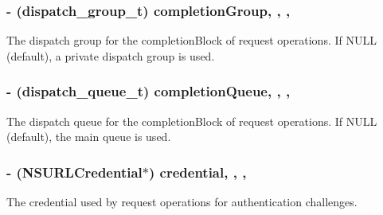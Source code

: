 \subsubsection[{completion\+Group}]{\setlength{\rightskip}{0pt plus 5cm}-\/ (dispatch\+\_\+group\+\_\+t) completion\+Group\hspace{0.3cm}{\ttfamily [read]}, {\ttfamily [write]}, {\ttfamily [nonatomic]}, {\ttfamily [assign]}}\label{interface_a_f_h_t_t_p_request_operation_manager_a82471e7500e97f86cec41fce3fc43347}
The dispatch group for the {\ttfamily completion\+Block} of request operations. If {\ttfamily N\+U\+L\+L} (default), a private dispatch group is used. \hypertarget{interface_a_f_h_t_t_p_request_operation_manager_af1b09e063908143fda4bb0b0b176908d}{}
\subsubsection[{completion\+Queue}]{\setlength{\rightskip}{0pt plus 5cm}-\/ (dispatch\+\_\+queue\+\_\+t) completion\+Queue\hspace{0.3cm}{\ttfamily [read]}, {\ttfamily [write]}, {\ttfamily [nonatomic]}, {\ttfamily [assign]}}\label{interface_a_f_h_t_t_p_request_operation_manager_af1b09e063908143fda4bb0b0b176908d}
The dispatch queue for the {\ttfamily completion\+Block} of request operations. If {\ttfamily N\+U\+L\+L} (default), the main queue is used. \hypertarget{interface_a_f_h_t_t_p_request_operation_manager_a95eccce77426e7b9022ac52d60749534}{}
\subsubsection[{credential}]{\setlength{\rightskip}{0pt plus 5cm}-\/ (N\+S\+U\+R\+L\+Credential$\ast$) credential\hspace{0.3cm}{\ttfamily [read]}, {\ttfamily [write]}, {\ttfamily [nonatomic]}, {\ttfamily [strong]}}\label{interface_a_f_h_t_t_p_request_operation_manager_a95eccce77426e7b9022ac52d60749534}
The credential used by request operations for authentication challenges.

